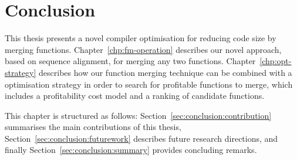 
\chapter{Conclusion} \label{chp:conclusion}

This thesis presents a novel compiler optimisation for reducing code size by merging functions.
Chapter~\ref{chp:fm-operation} describes our novel approach, based on sequence alignment, for merging any two functions.
Chapter~\ref{chp:opt-strategy} describes how our function merging technique can be combined with a optimisation strategy in order to search for profitable functions to merge, which includes a profitability cost model and a ranking of candidate functions.

This chapter is structured as follows:
Section~\ref{sec:conclusion:contribution} summarises the main contributions of this thesis,
Section~\ref{sec:conclusion:futurework} describes future research directions,
and finally Section~\ref{sec:conclusion:summary}  provides concluding remarks.




